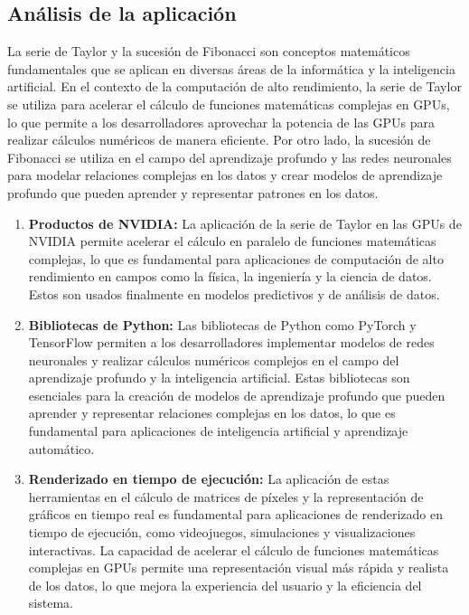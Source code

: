 \documentclass[11pt, a4paper]{article}
\begin{document}
\subsection{Análisis de la aplicación}

La serie de Taylor y la sucesión de Fibonacci son conceptos matemáticos fundamentales que se aplican en diversas áreas de la informática y la inteligencia artificial. En el contexto de la computación de alto rendimiento, la serie de Taylor se utiliza para acelerar el cálculo de funciones matemáticas complejas en GPUs, lo que permite a los desarrolladores aprovechar la potencia de las GPUs para realizar cálculos numéricos de manera eficiente. Por otro lado, la sucesión de Fibonacci se utiliza en el campo del aprendizaje profundo y las redes neuronales para modelar relaciones complejas en los datos y crear modelos de aprendizaje profundo que pueden aprender y representar patrones en los datos.

\begin{enumerate}
  \item \textbf{Productos de NVIDIA:} La aplicación de la serie de Taylor en las GPUs de NVIDIA permite acelerar el cálculo en paralelo de funciones matemáticas complejas, lo que es fundamental para aplicaciones de computación de alto rendimiento en campos como la física, la ingeniería y la ciencia de datos. Estos son usados finalmente en modelos predictivos y de análisis de datos.
  
  \item \textbf{Bibliotecas de Python:} Las bibliotecas de Python como PyTorch y TensorFlow permiten a los desarrolladores implementar modelos de redes neuronales y realizar cálculos numéricos complejos en el campo del aprendizaje profundo y la inteligencia artificial. Estas bibliotecas son esenciales para la creación de modelos de aprendizaje profundo que pueden aprender y representar relaciones complejas en los datos, lo que es fundamental para aplicaciones de inteligencia artificial y aprendizaje automático.
  
  \item \textbf{Renderizado en tiempo de ejecución:} La aplicación de estas herramientas en el cálculo de matrices de píxeles y la representación de gráficos en tiempo real es fundamental para aplicaciones de renderizado en tiempo de ejecución, como videojuegos, simulaciones y visualizaciones interactivas. La capacidad de acelerar el cálculo de funciones matemáticas complejas en GPUs permite una representación visual más rápida y realista de los datos, lo que mejora la experiencia del usuario y la eficiencia del sistema.
  
\end{enumerate}
\end{document}
